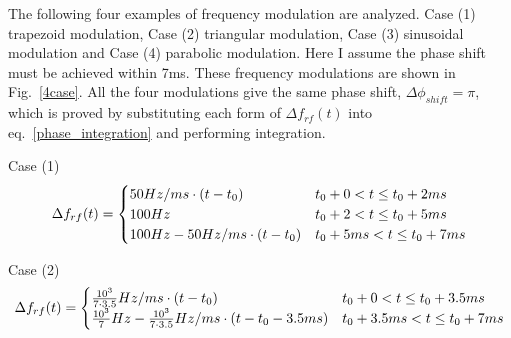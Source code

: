 The following four examples of frequency modulation are analyzed. Case (1) trapezoid modulation, Case (2) triangular modulation, Case (3) sinusoidal modulation and Case (4) parabolic modulation. Here I assume the phase shift must be achieved within 7ms. These frequency modulations are shown in Fig.~\ref{4case}. All the four modulations give the same phase shift, $\Delta \phi_{shift}=\pi$, which is proved by substituting each form of $\Delta f_{rf}(t)$ into eq.~\ref{phase_integration} and performing integration. 

%
%
%
%

Case (1) 
\begin{eqnarray}\Delta f_{rf}(t)=
\begin{cases}
50Hz/ms \cdot (t-t_0) &t_0+0<t\le t_0+2ms\cr  100Hz &t_0+2<t\le t_0+5ms \cr 100Hz-50Hz/ms \cdot (t-t_0) &t_0+5ms<t\le t_0+7ms\cr 
\end{cases}
\end{eqnarray}

Case (2) 
\begin{eqnarray}\Delta f_{rf}(t)=
\begin{cases}
\frac{10^3}{7\cdot 3.5}Hz/ms \cdot (t-t_0) &t_0+0<t\le t_0+3.5ms\cr  \frac{10^3}{7}Hz-{\frac{10^3}{7\cdot 3.5}Hz/ms}\cdot {(t-t_0-3.5ms)} &t_0+3.5ms<t\le t_0+7ms \cr 
\end{cases}
\end{eqnarray}

